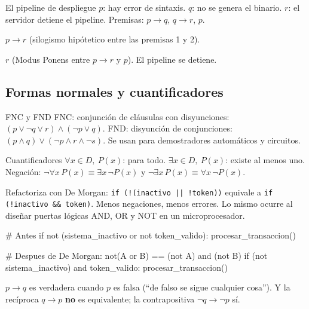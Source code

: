 \begin{tmejemplo}{El pipeline de despliegue}
$p$: hay error de sintaxis. $q$: no se genera el binario. $r$: el servidor detiene el pipeline. Premisas: $p\to q$, $q\to r$, $p$.
\begin{tmpasos}
\item $p\to r$ (silogismo hip\'otetico entre las premisas 1 y 2).
\item $r$ (Modus Ponens entre $p\to r$ y $p$). El pipeline se detiene.
\end{tmpasos}
\end{tmejemplo}

\subsection{Formas normales y cuantificadores}
\begin{tmdef}{FNC y FND}
FNC: conjunci\'on de cl\'ausulas con disyunciones: $(p\vee\neg q\vee r)\wedge(\neg p\vee q)$. FND: disyunci\'on de conjunciones: $(p\wedge q)\vee(\neg p\wedge r\wedge\neg s)$. Se usan para demostradores autom\'aticos y circuitos.
\end{tmdef}

\begin{tmdef}{Cuantificadores}
$\forall x\in D,\ P(x)$: para todo. $\exists x\in D,\ P(x)$: existe al menos uno. Negaci\'on: $\neg\forall x\,P(x)\equiv\exists x\,\neg P(x)$ y $\neg\exists x\,P(x)\equiv\forall x\,\neg P(x)$.
\end{tmdef}

\begin{tmsistemas}
Refactoriza con De Morgan: \texttt{if (!(inactivo || !token))} equivale a \texttt{if (!inactivo \&\& token)}. Menos negaciones, menos errores. Lo mismo ocurre al dise\~nar puertas l\'ogicas AND, OR y NOT en un microprocesador.
\end{tmsistemas}

\begin{tmcodigo}
# Antes
if not (sistema_inactivo or not token_valido):
    procesar_transaccion()

# Despues de De Morgan: not(A or B) == (not A) and (not B)
if (not sistema_inactivo) and token_valido:
    procesar_transaccion()
\end{tmcodigo}

\begin{tmcuidado}$p\to q$ es verdadera cuando $p$ es falsa (``de falso se sigue cualquier cosa''). Y la rec\'iproca $q\to p$ \textbf{no} es equivalente; la contrapositiva $\neg q\to\neg p$ s\'i.\end{tmcuidado}


